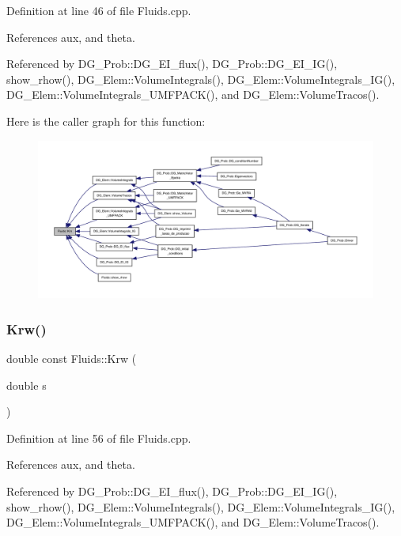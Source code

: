 Definition at line 46 of file Fluids.\+cpp.



References aux, and theta.



Referenced by D\+G\+\_\+\+Prob\+::\+D\+G\+\_\+\+E\+I\+\_\+flux(), D\+G\+\_\+\+Prob\+::\+D\+G\+\_\+\+E\+I\+\_\+\+I\+G(), show\+\_\+rhow(), D\+G\+\_\+\+Elem\+::\+Volume\+Integrals(), D\+G\+\_\+\+Elem\+::\+Volume\+Integrals\+\_\+\+I\+G(), D\+G\+\_\+\+Elem\+::\+Volume\+Integrals\+\_\+\+U\+M\+F\+P\+A\+C\+K(), and D\+G\+\_\+\+Elem\+::\+Volume\+Tracos().

Here is the caller graph for this function\+:
\nopagebreak
\begin{figure}[H]
\begin{center}
\leavevmode
\includegraphics[width=350pt]{classFluids_a01d25f71f5c00a566032c19bd63a473f_icgraph}
\end{center}
\end{figure}
\mbox{\label{classFluids_abaa29b5611ffefe8f2171692ffd62d38}} 
\subsubsection{\texorpdfstring{Krw()}{Krw()}}
{\footnotesize\ttfamily double const Fluids\+::\+Krw (\begin{DoxyParamCaption}\item[{double}]{s }\end{DoxyParamCaption})}



Definition at line 56 of file Fluids.\+cpp.



References aux, and theta.



Referenced by D\+G\+\_\+\+Prob\+::\+D\+G\+\_\+\+E\+I\+\_\+flux(), D\+G\+\_\+\+Prob\+::\+D\+G\+\_\+\+E\+I\+\_\+\+I\+G(), show\+\_\+rhow(), D\+G\+\_\+\+Elem\+::\+Volume\+Integrals(), D\+G\+\_\+\+Elem\+::\+Volume\+Integrals\+\_\+\+I\+G(), D\+G\+\_\+\+Elem\+::\+Volume\+Integrals\+\_\+\+U\+M\+F\+P\+A\+C\+K(), and D\+G\+\_\+\+Elem\+::\+Volume\+Tracos().

